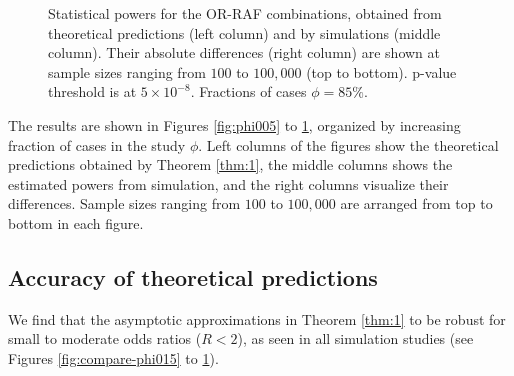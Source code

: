 \begin{figure}[!tpb]
{        }%
\caption{
Statistical powers for the OR-RAF combinations, obtained from theoretical predictions (left column) and by simulations (middle column). Their absolute differences (right column) are shown at sample sizes ranging from $100$ to $100,000$ (top to bottom).
p-value threshold is at $5\times10^{-8}$.
Fractions of cases $\phi=85\%$.
}\label{fig:phi085}
\end{figure}


The results are shown in Figures \ref{fig:phi005} to \ref{fig:phi085}, organized by increasing fraction of cases in the study $\phi$.
Left columns of the figures show the theoretical predictions obtained by Theorem \ref{thm:1}, the middle columns shows the estimated powers from simulation, and the right columns visualize their differences.
Sample sizes ranging from $100$ to $100,000$ are arranged from top to bottom in each figure.


\subsection{Accuracy of theoretical predictions}
\label{subsec:accuracy-of-asymptotics}


We find that the asymptotic approximations in Theorem \ref{thm:1} to be robust for small to moderate odds ratios ($R<2$), as seen in all simulation studies (see Figures \ref{fig:compare-phi015} to \ref{fig:phi085}).

